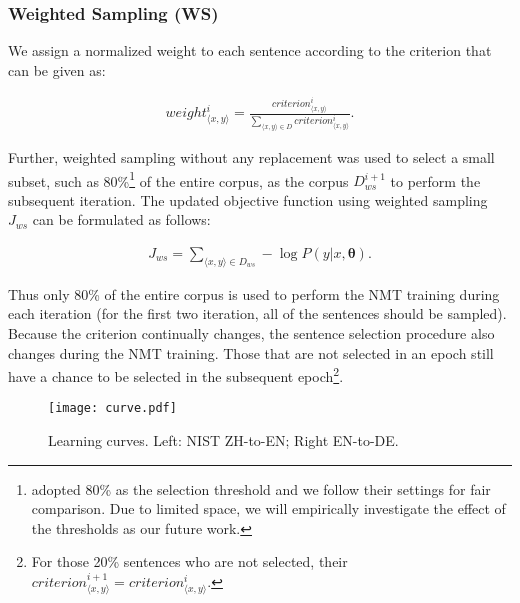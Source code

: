 \documentclass[11pt,a4paper]{article}
\begin{document}
\subsubsection{Weighted Sampling (WS)}
\label{sec:ws}

We assign a normalized weight to each sentence according to the criterion that can be given as:


	\begin{equation}
		\label{eq:ws}
		\begin{aligned}
			weight_{{\langle x, y\rangle}}^i = \frac{criterion_{{\langle x, y\rangle}}^i } {\sum_{\langle x, y\rangle \in D} criterion_{{\langle x, y\rangle}}^i}.
		\end{aligned}
	\end{equation}


Further, weighted sampling without any replacement was used to select a small subset, such as 80\%\footnote{\citet{zhang-EtAl:2017:I17-2} adopted 80\% as the selection threshold and we follow their settings for fair comparison. Due to limited space, we will empirically investigate the effect of the thresholds as our future work. } of the entire corpus, as the corpus $D_{ws}^{i+1}$ to perform the subsequent iteration. The updated objective function using weighted sampling $J_{ws}$ can be formulated as follows:


	\begin{equation}
		\label{eq:wsj}
		\begin{aligned}
			J_{ws}=\sum_{\langle x, y\rangle \in D_{ws}} -\log P(y|x, \bm{\theta}).
		\end{aligned}
	\end{equation}


Thus only 80\% of the entire corpus is used to perform the NMT training during each iteration (for the first two iteration, all of the sentences should be sampled). Because the criterion continually changes, the sentence selection procedure also changes during the NMT training. Those that are not selected in an epoch still have a chance to be selected in the subsequent epoch\footnote{For those 20\% sentences who are not selected, their $criterion_{{\langle x, y\rangle}}^{i+1} =  criterion_{{\langle x, y\rangle}}^{i}$.}.  

\begin{figure*}[ht]
	\centering
	\texttt{[image: curve.pdf]}		
	\caption{Learning curves. Left: NIST ZH-to-EN; Right EN-to-DE.}\label{fig:curve}
\end{figure*}
\end{document}
